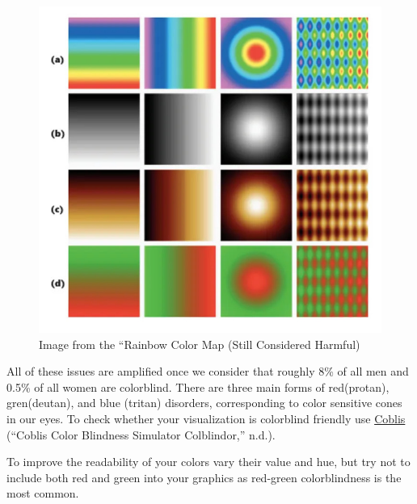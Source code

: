 \documentclass[
  letterpaper,
]{book}
\begin{document}
\begin{figure}

{\centering \includegraphics{./images/jet_comparison.jpg}

}

\caption{Image from the ``Rainbow Color Map (Still Considered Harmful)}

\end{figure}

All of these issues are amplified once we consider that roughly 8\% of
all men and 0.5\% of all women are colorblind. There are three main
forms of red(protan), gren(deutan), and blue (tritan) disorders,
corresponding to color sensitive cones in our eyes. To check whether
your visualization is colorblind friendly use
\href{https://www.color-blindness.com/coblis-color-blindness-simulator/}{Coblis}
({``Coblis {\textemdash} Color Blindness Simulator {\textendash}
Colblindor,''}
n.d.).

To improve the readability of your colors vary their value and hue, but
try not to include both red and green into your graphics as red-green
colorblindness is the most common.
\end{document}
